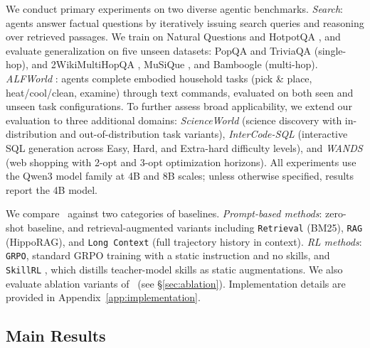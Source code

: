 \documentclass{article}
\theoremstyle{plain}
\theoremstyle{definition}
\theoremstyle{remark}
\begin{document}
We conduct primary experiments on two diverse agentic benchmarks. \textit{Search}: agents answer factual questions by iteratively issuing search queries and reasoning over retrieved passages. We train on Natural Questions \citep[NQ,][]{kwiatkowski2019natural} and HotpotQA \citep{yang2018hotpotqa}, and evaluate generalization on five unseen datasets: PopQA \citep{mallen2023popqa} and TriviaQA \citep{joshi2017triviaqa} (single-hop), and 2WikiMultiHopQA \citep{ho2020constructing}, MuSiQue \citep{trivedi2022musique}, and Bamboogle \citep{trivedi-etal-2023-interleaving} (multi-hop). \textit{ALFWorld} \citep{shridharalfworld}: agents complete embodied household tasks (pick \& place, heat/cool/clean, examine) through text commands, evaluated on both seen and unseen task configurations. To further assess broad applicability, we extend our evaluation to three additional domains: \textit{ScienceWorld} \citep{wang2022scienceworld} (science discovery with in-distribution and out-of-distribution task variants), \textit{InterCode-SQL} \citep{yang2023intercode} (interactive SQL generation across Easy, Hard, and Extra-hard difficulty levels), and \textit{WANDS} \citep{chen2022wands} (web shopping with 2-opt and 3-opt optimization horizons). All experiments use the Qwen3 model family \citep{bai2023qwen} at 4B and 8B scales; unless otherwise specified, results report the 4B model.

We compare \ours~against two categories of baselines. \textit{Prompt-based methods}: zero-shot baseline, and retrieval-augmented variants including \texttt{Retrieval} (BM25), \texttt{RAG} (HippoRAG), and \texttt{Long Context} (full trajectory history in context). \textit{RL methods}: \texttt{GRPO}, standard GRPO training with a static instruction and no skills, and \texttt{SkillRL} \citep{xia2025skillrl}, which distills teacher-model skills as static augmentations. We also evaluate ablation variants of \ours~(see \S\ref{sec:ablation}). Implementation details are provided in Appendix~\ref{app:implementation}.

\subsection{Main Results}
\end{document}
